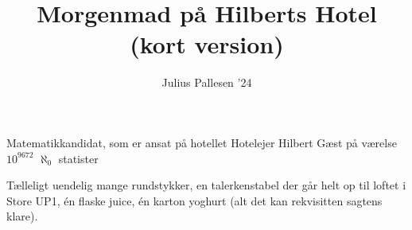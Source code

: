 \documentclass[a4paper,11pt]{article}
\title{Morgenmad på Hilberts Hotel (kort version)}
\author{Julius Pallesen '24}
\begin{document}
\maketitle

\begin{roles}
 Matematikkandidat, som er ansat på hotellet
 Hotelejer Hilbert
 Gæst på værelse $10^{9672}$
 $\aleph_0$ statister
\end{roles}

\begin{props}
     Tælleligt uendelig mange rundstykker, en talerkenstabel der går helt op til loftet i Store UP1, én flaske juice, én karton yoghurt (alt det kan rekvisitten sagtens klare).
\end{props}
\end{document}
